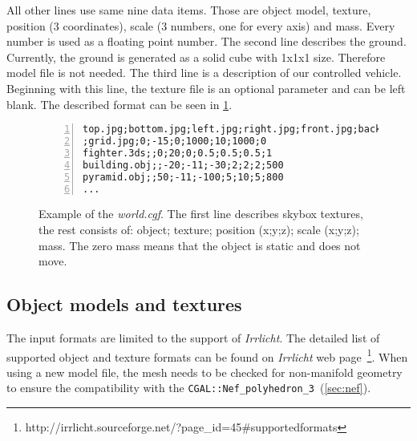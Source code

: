 All other lines use same nine data items. Those are object model, texture, position (3 coordinates), scale (3 numbers, one for every axis) and mass. Every number is used as a floating point number.
The second line describes the ground. Currently, the ground is generated as a solid cube with 1x1x1 size. Therefore model file is not needed. The third line is a description of our controlled vehicle. Beginning with this line, the texture file is an optional parameter and can be left blank. The described format can be seen in \cref{fig:world}.

\begin{figure}
\centering
\begin{Verbatim}[frame=single,numbers=left]
top.jpg;bottom.jpg;left.jpg;right.jpg;front.jpg;back.jpg
;grid.jpg;0;-15;0;1000;10;1000;0
fighter.3ds;;0;20;0;0.5;0.5;0.5;1
building.obj;;-20;-11;-30;2;2;2;500
pyramid.obj;;50;-11;-100;5;10;5;800
...
\end{Verbatim}
\caption{Example of the \emph{world.cgf}. The first line describes skybox textures, the rest consists of: object; texture; position (x;y;z); scale (x;y;z); mass. The zero mass means that the object is static and does not move.}
\label{fig:world}
\end{figure}


\subsection*{Object models and textures}
The input formats are limited to the support of \emph{Irrlicht}. The detailed list of supported object and texture formats can be found on \emph{Irrlicht} web page~\footnote{http://irrlicht.sourceforge.net/?page\_id=45\#supportedformats}. When using a new model file, the mesh needs to be checked for non-manifold geometry to ensure the compatibility with the {\tt CGAL::Nef\_polyhedron\_3}~(\cref{sec:nef}).


